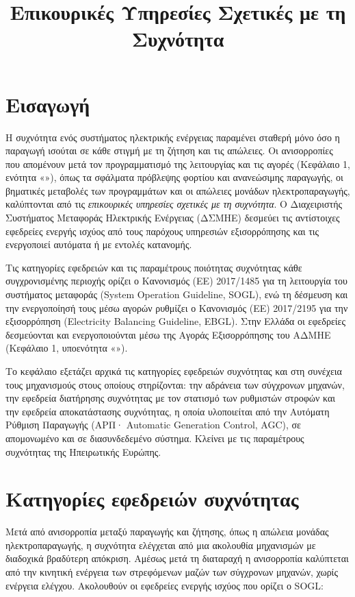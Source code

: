 \title{Επικουρικές Υπηρεσίες Σχετικές με τη Συχνότητα}

\section{Εισαγωγή}
\label{kef-03-theoria}

Η συχνότητα ενός συστήματος ηλεκτρικής ενέργειας παραμένει σταθερή μόνο όσο η παραγωγή ισούται
σε κάθε στιγμή με τη ζήτηση και τις απώλειες. Οι ανισορροπίες που απομένουν μετά τον
προγραμματισμό της λειτουργίας και τις αγορές (Κεφάλαιο 1, ενότητα «»),
όπως τα σφάλματα πρόβλεψης φορτίου και ανανεώσιμης παραγωγής, οι βηματικές μεταβολές των
προγραμμάτων και οι απώλειες μονάδων ηλεκτροπαραγωγής, καλύπτονται από τις \emph{επικουρικές
υπηρεσίες σχετικές με τη συχνότητα}. Ο Διαχειριστής Συστήματος Μεταφοράς Ηλεκτρικής
Ενέργειας (ΔΣΜΗΕ) δεσμεύει τις
αντίστοιχες εφεδρείες ενεργής ισχύος από τους παρόχους υπηρεσιών εξισορρόπησης και τις
ενεργοποιεί αυτόματα ή με εντολές κατανομής.

Τις κατηγορίες εφεδρειών και τις παραμέτρους ποιότητας συχνότητας κάθε συγχρονισμένης περιοχής
ορίζει ο Κανονισμός (ΕΕ) 2017/1485 για τη λειτουργία του συστήματος μεταφοράς (System
Operation Guideline, SOGL), ενώ τη δέσμευση και την ενεργοποίησή τους μέσω αγορών ρυθμίζει ο
Κανονισμός (ΕΕ) 2017/2195 για την εξισορρόπηση (Electricity Balancing Guideline, EBGL). Στην
Ελλάδα οι εφεδρείες δεσμεύονται και ενεργοποιούνται μέσω της Αγοράς Εξισορρόπησης του ΑΔΜΗΕ
(Κεφάλαιο 1, υποενότητα «»).

Το κεφάλαιο εξετάζει αρχικά τις κατηγορίες εφεδρειών συχνότητας και στη συνέχεια τους
μηχανισμούς στους οποίους στηρίζονται: την αδράνεια των σύγχρονων μηχανών, την εφεδρεία
διατήρησης συχνότητας με τον στατισμό των ρυθμιστών στροφών και την εφεδρεία αποκατάστασης
συχνότητας, η οποία υλοποιείται από την Αυτόματη Ρύθμιση Παραγωγής (ΑΡΠ· Automatic Generation
Control, AGC), σε απομονωμένο και σε διασυνδεδεμένο σύστημα. Κλείνει με τις παραμέτρους
συχνότητας της Ηπειρωτικής Ευρώπης.

\section{Κατηγορίες εφεδρειών συχνότητας}
\label{sec:reserves}

Μετά από ανισορροπία μεταξύ παραγωγής και ζήτησης, όπως η απώλεια μονάδας ηλεκτροπαραγωγής, η
συχνότητα ελέγχεται από μια ακολουθία μηχανισμών με διαδοχικά βραδύτερη απόκριση. Αμέσως μετά
τη διαταραχή η ανισορροπία καλύπτεται από την κινητική ενέργεια των στρεφόμενων μαζών των
σύγχρονων μηχανών, χωρίς ενέργεια ελέγχου. Ακολουθούν οι εφεδρείες ενεργής ισχύος που ορίζει ο
SOGL:

